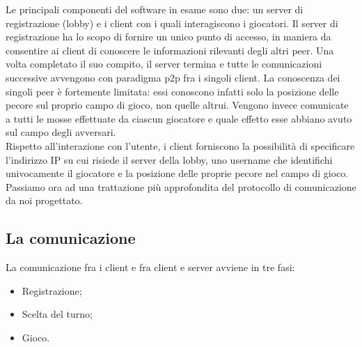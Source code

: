 Le principali componenti del software in esame sono due: un server di 
registrazione (lobby) e i client con i quali interagiscono i giocatori.
Il server di registrazione ha lo scopo di fornire un unico punto di accesso, 
in maniera da consentire ai client di conoscere le informazioni rilevanti degli 
altri peer. Una volta completato il suo compito, il server termina e tutte le 
comunicazioni successive avvengono con paradigma p2p fra i singoli client.
La conoscenza dei singoli peer è fortemente limitata: essi conoscono infatti 
solo la posizione delle pecore sul proprio campo di gioco, non quelle altrui. 
Vengono invece comunicate a tutti le mosse effettuate da ciascun giocatore e 
quale effetto esse abbiano avuto sul campo degli avversari.
\\
Rispetto all'interazione con l'utente, i client forniscono la possibilità di 
specificare l'indirizzo IP su cui risiede il server della lobby, uno username 
che identifichi univocamente il giocatore e la posizione delle proprie pecore 
nel campo di gioco.
\\
Passiamo ora ad una trattazione più approfondita del protocollo di 
comunicazione da noi progettato.

\subsection{La comunicazione}
La comunicazione fra i client e fra client e server avviene in tre fasi:
\begin{itemize}
 \item Registrazione;
 \item Scelta del turno;
\item Gioco.
\end{itemize}

